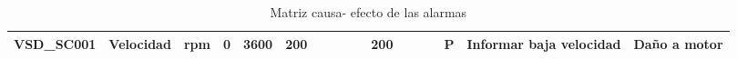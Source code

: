 \begin{table}[p]
{{\begin{tabular}{|l|l|l|l|l|l|l|l|l|l|l|l|l|l|l|l|l|}
				\hline
				\textbf{VSD\_SC001}                                                                                               & Velocidad                                               & rpm                                                     & 0                                                               & 3600                                                            & 200                                                               &                                                                &                                                                &                                                                   &                                                                   & 200                                                               &                                                                &                                                                &                                                                   & P                                                               & Informar baja velocidad                                                                                               & Daño a motor                                                                                                                   \\
				\hline
			\end{tabular}
			
			
		}
	}
	\caption{Matriz causa- efecto de las alarmas}
	\label{c2_tabla_segento_tcp}
	
\end{table}


